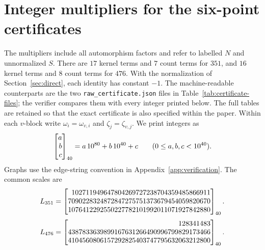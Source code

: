 \documentclass[11pt]{article}
\theoremstyle{remark}
\numberwithin{equation}{section}
\begin{document}
\section{Integer multipliers for the six-point certificates}\label{app:weights}
\providecommand{\srgBigInt}[3]{\left[\begin{array}{@{}r@{}}#1\\#2\\#3\end{array}\right]_{40}}
The multipliers include all automorphism factors and refer to labelled
$N$ and unnormalized $S$. There are $17$ kernel terms and $7$ count
terms for $351$, and $16$ kernel terms and $8$ count terms for $476$.
With the normalization of Section~\ref{sec:direct}, each identity has
constant $-1$. The machine-readable counterparts are the two
\nolinkurl{raw_certificate.json} files in Table~\ref{tab:certificate-files};
the verifier compares them with every integer printed below. The full
tables are retained so that the exact certificate is also specified
within the paper. Within each $v$-block write
$\omega_i=\omega_{v,i}$ and $\zeta_j=\zeta_{v,j}$. We print integers as
\[
 \srgBigInt{a}{b}{c}=a\,10^{80}+b\,10^{40}+c
 \qquad(0\le a,b,c<10^{40}).
\]
Graphs use the edge-string convention in Appendix~\ref{app:verification}.
The common scales are
\[
 L_{351}=\srgBigInt{102711949647804269727238704359485866911}{7090228324872847275751373679454059820670}{1076412292550227782101992011071927842880}.
\]
\[
 L_{476}=\srgBigInt{128341483}{4387833639899167631266490996799829173466}{4104560806157292825403747795632063212800}.
\]
\clearpage
\begingroup\fontsize{7.2}{9}\selectfont
\setlength{\tabcolsep}{1.5pt}
\renewcommand{\arraystretch}{1.06}
\end{document}
